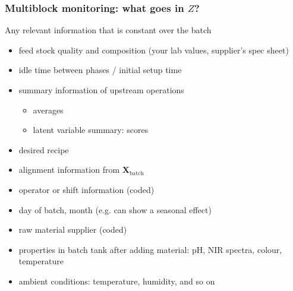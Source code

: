 \begin{frame}\frametitle{Multiblock monitoring: what goes in \( Z \)?}

\begin{block}{}
Any relevant information that is constant over the batch 
\end{block}

\begin{itemize}
	\item	feed stock quality and composition (your lab values, supplier's spec sheet)	
	\item	idle time between phases / initial setup time
	\item	summary information of upstream operations
			\begin{itemize}
				\item	averages				
				\item	latent variable summary: scores
			\end{itemize}
	\item	desired recipe	
	\item	alignment information from \( \mathbf{X}_\text{batch} \)
	\item	operator or shift information (coded)
	\item	day of batch, month (e.g. can show a seasonal effect)
	\item	raw material supplier (coded)
	\item	properties in batch tank after adding material: pH, NIR spectra, colour, temperature
	\item	ambient conditions: temperature, humidity, and so on
\end{itemize}
\end{frame}

